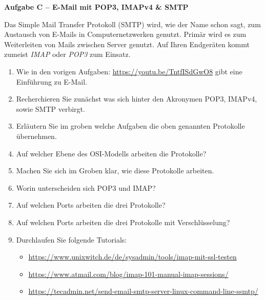 \documentclass[paper=a4,fontsize=11pt]{scrartcl}%
\numberwithin{equation}{section}
\begin{document}
\begin{center}\Large{\textbf{Aufgabe C -- E-Mail mit POP3, IMAPv4 \& SMTP}}\end{center}\vskip0.25in
Das Simple Mail Transfer Protokoll (SMTP) wird, wie der Name schon sagt, zum Austausch von E-Mails in Computernetzwerken genutzt. Primär wird es zum Weiterleiten von Mails zwischen Server genutzt. Auf Ihren Endgeräten kommt zumeist \emph{IMAP} oder \emph{POP3} zum Einsatz. 
\begin{enumerate}
	\item Wie in den vorigen Aufgaben: \url{https://youtu.be/TntfISdGwO8} gibt eine Einführung zu E-Mail.
	\item Recherchieren Sie zunächst was sich hinter den Akronymen POP3, IMAPv4, sowie SMTP verbirgt.
	\item Erläutern Sie im groben welche Aufgaben die oben genannten Protokolle übernehmen.
	\item Auf welcher Ebene des OSI-Modells arbeiten die Protokolle?
	\item Machen Sie sich im Groben klar, wie diese Protokolle arbeiten.	
	\item Worin unterscheiden sich POP3 und IMAP?
	\item Auf welchen Ports arbeiten die drei Protokolle?
	\item Auf welchen Ports arbeiten die drei Protokolle mit Verschlüsselung?
	\item Durchlaufen Sie folgende Tutorials:
	\begin{itemize}
		\item \url{https://www.unixwitch.de/de/sysadmin/tools/imap-mit-ssl-testen}
		\item \url{https://www.atmail.com/blog/imap-101-manual-imap-sessions/}
		\item \url{https://tecadmin.net/send-email-smtp-server-linux-command-line-ssmtp/}
	\end{itemize}
\end{enumerate}
\end{document}

